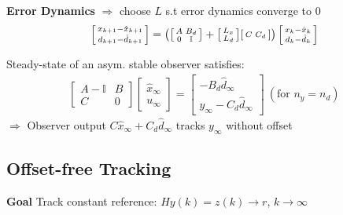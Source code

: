 \textbf{Error Dynamics} $\Rightarrow$
choose $L$ s.t error dynamics converge to $0$
\begin{align*}
	\begin{bsmallmatrix}
		x_{k+1} - \hat{x}_{k+1} \\
		d_{k+1} - \hat{d}_{k+1}
	\end{bsmallmatrix}
	= \left(
	\begin{bsmallmatrix}
		A & B_d        \\
		0 & \mathbb{I}
	\end{bsmallmatrix}
	+
	\begin{bsmallmatrix}
		L_x \\
		L_d
	\end{bsmallmatrix}
	\begin{bsmallmatrix}
		C & C_d
	\end{bsmallmatrix}
	\right)
	\begin{bsmallmatrix}
		x_{k} - \hat{x}_{k} \\
		d_{k} - \hat{d}_{k}
	\end{bsmallmatrix}
\end{align*}

\begin{lemma}
	Steady-state of an asym. stable
	observer satisfies:
	\begin{align*}
		\begin{bmatrix}
			A-\mathbb{I} & B \\
			C            & 0
		\end{bmatrix}
		\begin{bmatrix}
			\hat{x}_\infty \\
			u_\infty
		\end{bmatrix}
		=
		\begin{bmatrix}
			-B_d \hat{d}_\infty \\
			y_\infty - C_d \hat{d}_\infty
		\end{bmatrix}
		\ (\text{for }n_y = n_d)
	\end{align*}
	$\Rightarrow$ Observer output $C\hat{x}_\infty + C_d \hat{d}_\infty$ tracks $y_\infty$ without offset
\end{lemma}

\subsection{Offset-free Tracking}

\textbf{Goal}
Track constant reference:
$Hy(k) = z(k) \to r$, $k\to\infty$

